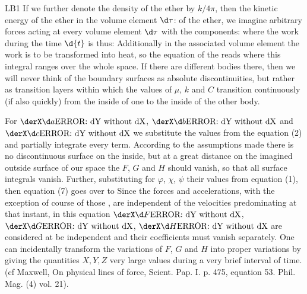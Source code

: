 \begin{paper}{LB1}
If we further denote the density of the ether by $k/4\pi$, then the kinetic energy of the ether in the volume element $\d\tau$:
 of the ether, we imagine arbitrary forces acting at every volume element $\d\tau$ with the components:
where the work during the time $\d{t}$ is thus:
Additionally in the associated volume element the work
is to be transformed into heat, so the equation of the  reads
where this integral ranges over the whole space. If there are different bodies there, then we will never think of the boundary surfaces as absolute discontinuities, but rather as transition layers within which the values of $\mu$, $k$ and $C$ transition continuously (if also quickly) from the inside of one to the inside of the other body.

For $\ddt{a}$, $\ddt{b}$ and $\ddt{c}$ we substitute the values from the equation (2) and partially integrate every term. According to the assumptions made there is no discontinuous surface on the inside, but at a great distance on the imagined outside surface of our space the $F$, $G$ and $H$ should vanish, so that all surface integrals vanish. Further, substituting for $\varphi$, $\chi$, $\psi$ their values from equation (1), then equation (7) goes over to
Since the forces and accelerations, with the exception of course of those , are independent of the velocities predominating at that instant, in this equation $\ddt{F}$, $\ddt{G}$, $\ddt{H}$ are considered at be independent and their coefficients must vanish separately. One can incidentally transform the variations of $F$, $G$ and $H$ into proper variations by giving the quantities $X,Y,Z$ very large values during a very brief interval of time. (cf Maxwell, On physical lines of force, Scient. Pap. I. p. 475, equation 53. Phil. Mag. (4) vol. 21).


\end{paper}

